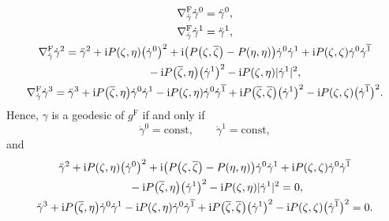 \documentclass[pdftex]{sigma}
\newcommand\ol{\overline}
\numberwithin{equation}{section}
\begin{document}
\begin{gather*}
\nabla^{\mathrm{F}}_{\dot\gamma}\dot\gamma^0=\ddot\gamma^0, \\
\nabla^{\mathrm{F}}_{\dot\gamma}\dot\gamma^1=\ddot\gamma^1, \\
\nabla^{\mathrm{F}}_{\dot\gamma}\dot\gamma^2
= \ddot\gamma^2+{\rm i}P(\zeta, \eta)\bigl(\dot\gamma^0\bigr)^2+{\rm i}\bigl(P\bigl(\zeta, \ol\zeta\bigr)-P(\eta, \eta)\bigr)\dot\gamma^0\dot\gamma^1+{\rm i}P(\zeta, \zeta)\dot\gamma^0\dot\gamma^{\ol1} \\
\hphantom{\nabla^{\mathrm{F}}_{\dot\gamma}\dot\gamma^2=}{}
-{\rm i}P\bigl(\ol\zeta, \eta\bigr)\bigl(\dot\gamma^1\bigr)^2-{\rm i}P(\zeta, \eta)|\dot\gamma^1|^2, \\
\nabla^{\mathrm{F}}_{\dot\gamma}\dot\gamma^3
=\ddot\gamma^3+{\rm i}P\bigl(\ol\zeta, \eta\bigr)\dot\gamma^0\dot\gamma^1-{\rm i}P(\zeta, \eta)\dot\gamma^0\dot\gamma^{\ol1}+{\rm i}P\bigl(\ol\zeta, \ol\zeta\bigr)\bigl(\dot\gamma^1\bigr)^2-{\rm i}P(\zeta, \zeta)\bigl(\dot\gamma^{\ol1}\bigr)^2.
\end{gather*}
Hence, $\gamma$ is a geodesic of $g^{\mathrm{F}}$ if and only if
\begin{equation*}
\dot\gamma^0=\mathrm{const}, \qquad \dot\gamma^1=\mathrm{const},
\end{equation*}
and
\begin{gather}
 \ddot\gamma^2+{\rm i}P(\zeta, \eta)\bigl(\dot\gamma^0\bigr)^2+{\rm i}\bigl(P\bigl(\zeta, \ol\zeta\bigr)-P(\eta, \eta)\bigr)\dot\gamma^0\dot\gamma^1+{\rm i}P(\zeta, \zeta) \dot\gamma^0\dot\gamma^{\ol1} \nonumber \\
 \qquad{} -{\rm i}P\bigl(\ol\zeta, \eta\bigr)\bigl(\dot\gamma^1\bigr)^2-{\rm i}P(\zeta, \eta)|\dot\gamma^1|^2=0,\label{geodesic2}
\\
\ddot\gamma^3+{\rm i}P\bigl(\ol\zeta, \eta\bigr)\dot\gamma^0\dot\gamma^1-{\rm i}P(\zeta, \eta)\dot\gamma^0\dot\gamma^{\ol1}+{\rm i}P\bigl(\ol\zeta, \ol\zeta\bigr)\bigl(\dot\gamma^1\bigr)^2-{\rm i}P(\zeta, \zeta)\bigl(\dot\gamma^{\ol1}\bigr)^2=0.\label{geodesic3}
\end{gather}
\end{document}
